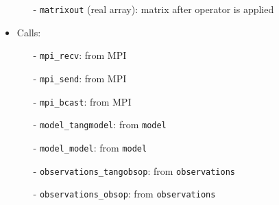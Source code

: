 \documentclass[12pt]{article}
\begin{document}
\begin{itemize}
\begin{itemize}
\item[-] {\tt matrixout} (real array): matrix after operator is applied
\end{itemize}
\item Calls: 
\begin{itemize}
\item[-] {\tt mpi\_recv}: from MPI
\item[-] {\tt mpi\_send}: from MPI
\item[-] {\tt mpi\_bcast}: from MPI
\item[-] {\tt model\_tangmodel}: from {\tt model}
\item[-] {\tt model\_model}: from {\tt model}
\item[-] {\tt observations\_tangobsop}: from {\tt observations}
\item[-] {\tt observations\_obsop}: from {\tt observations}
\end{itemize}
\end{itemize} 
\end{document}
